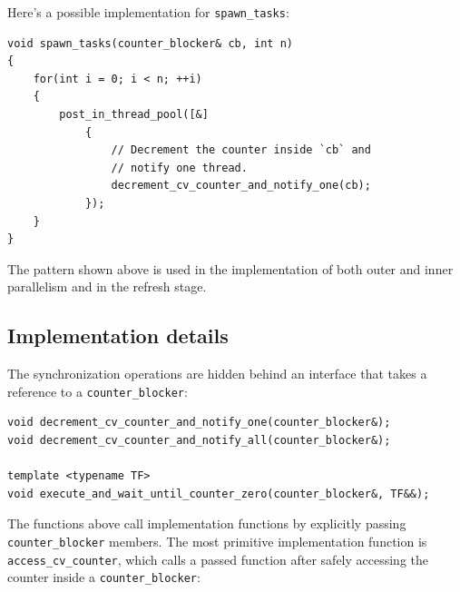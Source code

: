 \documentclass[twoside, 12pt, a4paper, openany]{book}
\begin{document}
Here's a possible implementation for
\texttt{spawn_tasks}:

\begin{verbatim}
void spawn_tasks(counter_blocker& cb, int n)
{
    for(int i = 0; i < n; ++i)
    {
        post_in_thread_pool([&]
            {
                // Decrement the counter inside `cb` and
                // notify one thread.
                decrement_cv_counter_and_notify_one(cb);
            });
    }
}
\end{verbatim}

The pattern shown above is used in the implementation of both outer and
inner parallelism and in the refresh stage.

\subsection{Implementation details}\label{implementation-details}

The synchronization operations are hidden behind an interface that takes
a reference to a
\texttt{counter_blocker}:

\begin{verbatim}
void decrement_cv_counter_and_notify_one(counter_blocker&);
void decrement_cv_counter_and_notify_all(counter_blocker&);

template <typename TF>
void execute_and_wait_until_counter_zero(counter_blocker&, TF&&);
\end{verbatim}

The functions above call implementation functions by explicitly passing
\texttt{counter_blocker}
members. The most primitive implementation function is
\texttt{access_cv_counter},
which calls a passed function after safely accessing the counter inside
a
\texttt{counter_blocker}:
\end{document}
